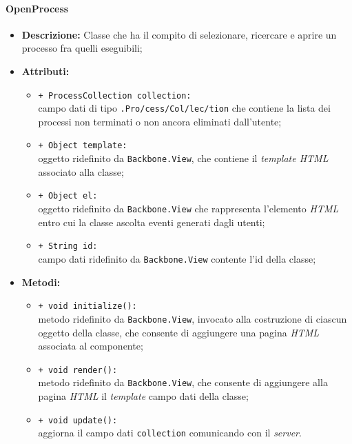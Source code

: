 \paragraph{OpenProcess}
\begin{flushleft}
\begin{itemize}
\item \textbf{Descrizione:} Classe che ha il compito di selezionare, ricercare e aprire un processo fra quelli eseguibili;
\item \textbf{Attributi:}
\begin{sloppypar}
\begin{itemize}
\item \texttt{+ ProcessCollection collection:}\\ campo dati di tipo \texttt{\collection{}.Pro\fshyp{}cess\fshyp{}Col\fshyp{}lec\fshyp{}tion} che contiene la lista dei processi non terminati o non ancora eliminati dall'utente;
\item \texttt{+ Object template:}\\ oggetto ridefinito da \texttt{Backbone.View}, che contiene il \textit{template HTML} associato alla classe;
\item \texttt{+ Object el:}\\ oggetto ridefinito da \texttt{Backbone.View} che rappresenta l'elemento \textit{HTML} entro cui la classe ascolta eventi generati dagli utenti;
\item \texttt{+ String id:}\\ campo dati ridefinito da \texttt{Backbone.View} contente l'id della classe;
\end{itemize}
\end{sloppypar}
\item \textbf{Metodi:}
\begin{sloppypar}
\begin{itemize}
\item \texttt{+ void initialize():}\\ metodo ridefinito da \texttt{Backbone.View}, invocato alla costruzione di ciascun oggetto della classe, che consente di aggiungere una pagina \textit{HTML} associata al componente;
\item \texttt{+ void render():}\\ metodo ridefinito da \texttt{Backbone.View}, che consente di aggiungere alla pagina \textit{HTML} il \textit{template} campo dati della classe;
\item \texttt{+ void update():}\\ aggiorna il campo dati \texttt{collection} comunicando con il \textit{server}.
\end{itemize}
\end{sloppypar}
\end{itemize}
\end{flushleft}

